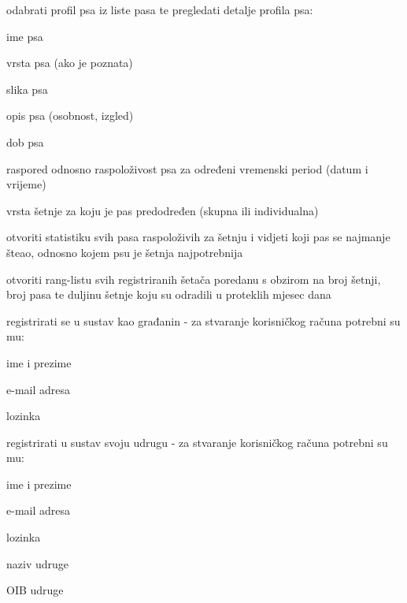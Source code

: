 \begin{packed_enum}
\begin{packed_enum}
				\item odabrati profil psa iz liste pasa te pregledati detalje profila psa: 
				\begin{packed_enum}
					\item ime psa
					\item vrsta psa (ako je poznata)
					\item slika psa
					\item opis psa (osobnost, izgled)
					\item dob psa
					\item raspored odnosno raspoloživost psa za određeni vremenski period (datum i vrijeme) 
					\item vrsta šetnje za koju je pas predodređen (skupna ili individualna)
				\end{packed_enum} 
				\item otvoriti statistiku svih pasa raspoloživih za šetnju i vidjeti koji pas se najmanje šteao, odnosno kojem psu je šetnja najpotrebnija
				\item  otvoriti rang-listu svih registriranih šetača poredanu s obzirom na broj šetnji, broj pasa te duljinu šetnje koju su odradili u proteklih mjesec dana
				\item registrirati se u sustav kao građanin - za stvaranje korisničkog računa potrebni su mu:
				\begin{packed_enum}
					\item ime i prezime
					\item e-mail adresa
					\item lozinka 
				\end{packed_enum}
				\item registrirati u sustav svoju udrugu - za stvaranje korisničkog računa potrebni su mu:
				\begin{packed_enum}
					\item ime i prezime
					\item e-mail adresa
					\item lozinka 
					\item naziv udruge
					\item OIB udruge
				\end{packed_enum}
			
				
			\end{packed_enum}
			\vspace{5mm}
			

\end{packed_enum}
